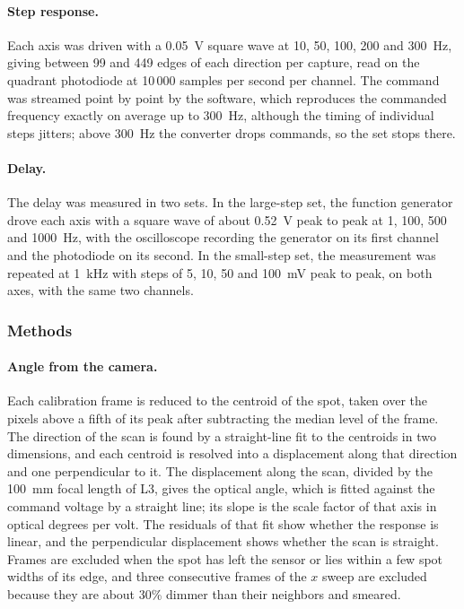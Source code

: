 \documentclass{article}
\begin{document}
\paragraph{Step response.}
Each axis was driven with a 0.05~V square wave at 10, 50, 100, 200 and 300~Hz, giving between
99 and 449 edges of each direction per capture, read on the quadrant photodiode at 10\,000 samples per second per channel. The command was
streamed point by point by the software, which reproduces the commanded frequency exactly on
average up to 300~Hz, although the timing of individual steps jitters; above 300~Hz the converter
drops commands, so the set stops there.

\paragraph{Delay.}
The delay was measured in two sets. In the large-step set, the function generator drove each axis
with a square wave of about 0.52~V peak to peak at 1, 100, 500 and 1000~Hz, with the oscilloscope
recording the generator on its first channel and the photodiode on its second. In the small-step
set, the measurement was repeated at 1~kHz with steps of 5, 10, 50 and 100~mV peak to peak, on both
axes, with the same two channels.

\subsubsection{Methods}

\paragraph{Angle from the camera.}
Each calibration frame is reduced to the centroid of the spot, taken over the pixels above a fifth
of its peak after subtracting the median level of the frame. The direction of the scan is found by
a straight-line fit to the centroids in two dimensions, and each centroid is resolved into a
displacement along that direction and one perpendicular to it. The displacement along the scan,
divided by the 100~mm focal length of L3, gives the optical angle, which is fitted against the
command voltage by a straight line; its slope is the scale factor of that axis in optical degrees
per volt. The residuals of that fit show whether the response is linear, and the perpendicular
displacement shows whether the scan is straight. Frames are excluded when the spot has left the
sensor or lies within a few spot widths of its edge, and three consecutive frames of the $x$ sweep
are excluded because they are about 30\% dimmer than their neighbors and smeared.
\end{document}
